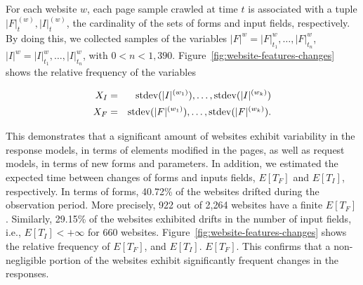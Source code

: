 For each website $w$, each page sample crawled at time $t$ is
associated with a tuple $|F|^{(w)}_{t}, |I|^{(w)}_{t}$, the
cardinality of the sets of forms and input fields, respectively. By
doing this, we collected samples of the variables $|F|^{w} =
|F|^{w}_{t_{1}}, \dots, |F|^{w}_{t_{n}}$, $|I|^{w} = |I|^{w}_{t_{1}},
\dots, |I|^{w}_{t_{n}}$, with $0 < n <
1,390$. Figure~\ref{fig:website-features-changes} shows the relative
frequency of the variables

\begin{eqnarray*}
  X_{I} &=& \operatorname{stdev}(|I|^{(w_{1})}), \dots, \operatorname{stdev}(|I|^{(w_{k})})\\
  X_{F} &=& \operatorname{stdev}(|F|^{(w_{1})}), \dots, \operatorname{stdev}(|F|^{(w_{k})}).
\end{eqnarray*}

This demonstrates that a significant amount of websites exhibit
variability in the response models, in terms of elements modified in
the pages, as well as request models, in terms of new forms and
parameters. In addition, we estimated the expected time between
changes of forms and inputs fields, $E[T_{F}]$ and $E[T_{I}]$,
respectively. In terms of forms, 40.72\% of the websites drifted
during the observation period. More precisely, 922 out of 2,264
websites have a finite $E[T_{F}]$. Similarly, 29.15\% of the websites
exhibited drifts in the number of input fields, i.e., $E[T_{I}] <
+\infty$ for 660 websites. Figure~\ref{fig:website-features-changes}
shows the relative frequency of
 $E[T_{F}]$, and
$E[T_{I}]$. $E[T_{F}]$. This confirms that a non-negligible portion of
the websites exhibit significantly frequent changes in the responses.


